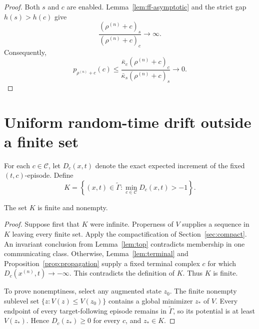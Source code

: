 \begin{proof}
Both \(s\) and \(c\) are enabled.  Lemma~\ref{lem:ff-asymptotic} and the
strict gap \(h(s)>h(c)\) give
\[
  \frac{(\rho^{(n)}+c)_s}{(\rho^{(n)}+c)_c}\longrightarrow\infty.
\]
Consequently,
\[
 p_{\rho^{(n)}+c}(c)
 \le
 \frac{\bar\kappa_c(\rho^{(n)}+c)_c}
      {\bar\kappa_s(\rho^{(n)}+c)_s}
 \longrightarrow0.
\]
\end{proof}

\section{Uniform random-time drift outside a finite set}\label{sec:uniform}

For each \(c\in\mathcal C\), let \(D_c(x,t)\) denote the exact expected
increment of the fixed \((t,c)\)-episode.  Define
\begin{equation}\label{eq:K}
 K=\left\{(x,t)\in\widetilde\Gamma:
          \min_{c\in\mathcal C}D_c(x,t)>-1\right\}.
\end{equation}

\begin{proposition}\label{prop:K}
The set \(K\) is finite and nonempty.
\end{proposition}

\begin{proof}
Suppose first that \(K\) were infinite.  Properness of \(V\) supplies a
sequence in \(K\) leaving every finite set.  Apply the compactification of
Section~\ref{sec:compact}.  An invariant conclusion from
Lemma~\ref{lem:top} contradicts membership in one communicating class.
Otherwise, Lemma~\ref{lem:terminal} and
Proposition~\ref{prop:propagation} supply a fixed terminal complex \(c\) for
which \(D_c(x^{(n)},t)\to-\infty\).  This contradicts the definition of
\(K\).  Thus \(K\) is finite.

To prove nonemptiness, select any augmented state \(z_0\).  The finite
nonempty sublevel set \(\{z:V(z)\le V(z_0)\}\) contains a global minimizer
\(z_*\) of \(V\).  Every endpoint of every target-following episode remains
in \(\widetilde\Gamma\), so its potential is at least \(V(z_*)\).  Hence
\(D_c(z_*)\ge0\) for every \(c\), and \(z_*\in K\).
\end{proof}

